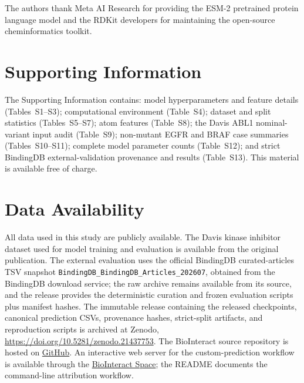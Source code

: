 \documentclass[fleqn,10pt]{wlscirep}
\begin{document}
The authors thank Meta AI Research for providing the ESM-2 pretrained protein
language model and the RDKit developers for maintaining the open-source
cheminformatics toolkit.

\section*{Supporting Information}

The Supporting Information contains: model hyperparameters and feature details
(Tables~S1--S3); computational environment (Table~S4); dataset and split
statistics (Tables~S5--S7); atom features (Table~S8); the Davis ABL1
nominal-variant input audit (Table~S9); non-mutant EGFR and BRAF case summaries
(Tables~S10--S11); complete model parameter counts (Table~S12); and strict
BindingDB external-validation provenance and results (Table~S13).
This material is available free of charge.

\section*{Data Availability}

All data used in this study are publicly available. The Davis kinase inhibitor
dataset used for model training and evaluation is available from the original
publication.\cite{davis2011comprehensive} The external evaluation uses the official
BindingDB curated-articles TSV snapshot
\texttt{BindingDB\_BindingDB\_Articles\_202607}, obtained from the BindingDB
download service;\cite{gilson2016bindingdb} the raw archive remains available from
its source, and the release provides the deterministic curation and frozen
evaluation scripts plus manifest hashes. The immutable release containing the
released checkpoints, canonical prediction CSVs, provenance hashes, strict-split
artifacts, and reproduction scripts is archived at Zenodo,
\url{https://doi.org/10.5281/zenodo.21437753}. The BioInteract source repository
is hosted on \href{https://github.com/Liubo-520/bio-intelligence}{GitHub}. An interactive web
server for the custom-prediction workflow is available through the
\href{https://huggingface.co/spaces/AI4deeperScience/BioInteract}{BioInteract Space}; the README
documents the command-line attribution workflow.
\end{document}
